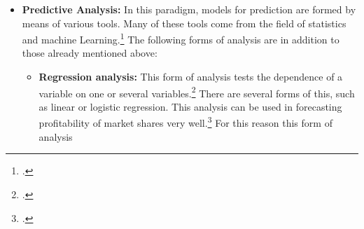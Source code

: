 \begin{itemize}
\begin{itemize}
        The application of this analysis is classically in understanding
        of demographic factors in the purchase of products.\footcite[Cf.][p. 98]{bihani2014comparative} Of interest is this
        form of analysis for interpreting identical \acp{KPI} from different data centers. It is precisely the analysis of
        differences of data between data centers enables the generation of new knowledge and is thus in the field of
        \ac{BI} of immediate relevance. The application of discriminant function analysis is therefore useful for all partial hypotheses
        useful as soon as more than one data center is considered.
        \item \textbf{Structural equation model: }In this process, dependencies between variables are formed and checked by means of linear
        equation systems to test whether this relationship actually exists.\footcite[Cf.][pp. 98]{bihani2014comparative} As
        result, the dependence or independence on the given model is determined.\footcite[Cf.][pp. 98]{bihani2014comparative}
        It is precisely to determine possible dependencies between the individual \acp{KPI} that this form of analysis can be used.
        A simple example is the dependency of the hashrate to the yield through the mining pool. Because of this
        the structural equation model also finds useful application in the present partial hypotheses.
    \end{itemize}
    In summary, it can be stated that there are a variety of different ways to analyze the present data
    and to generate knowledge for the stakeholders. With the help of the present forms of analysis
    a descriptive \ac{BI} process with the partial hypotheses is feasible.
    \item \textbf{Predictive Analysis: }In this paradigm, models for prediction are formed by means of various tools.
    Many of these tools come from the field of statistics and machine
    Learning.\footcite[Cf.][Fig. 1]{bihani2014comparative} The following forms of analysis are in addition to those already
    mentioned above:
    \begin{itemize}
        \item \textbf{Regression analysis: }This form of analysis tests the dependence of a variable on one or
        several variables.\footcite[Cf.][pp. 97]{bihani2014comparative} There are several forms of this, such as linear
        or logistic regression. This analysis can be used in forecasting profitability
        of market shares very well.\footcite[Cf.][p. 99]{bihani2014comparative} For this reason this form of analysis

\end{itemize}
\end{itemize}
